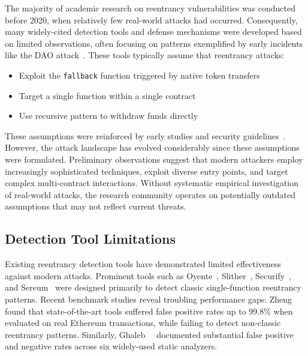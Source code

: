 The majority of academic research on reentrancy vulnerabilities was conducted before 2020, when relatively few real-world attacks had occurred. Consequently, many widely-cited detection tools and defense mechanisms were developed based on limited observations, often focusing on patterns exemplified by early incidents like the DAO attack~\cite{oyente, slither, sereum}. These tools typically assume that reentrancy attacks:
\begin{itemize}
    \item Exploit the \lstinline{fallback} function triggered by native token transfers
    \item Target a single function within a single contract
    \item Use recursive pattern to withdraw funds directly
\end{itemize}
These assumptions were reinforced by early studies and security guidelines~\cite{smart-contract-security-field-guide, rethinking-of-reentrancy}. However, the attack landscape has evolved considerably since these assumptions were formulated. Preliminary observations suggest that modern attackers employ increasingly sophisticated techniques, exploit diverse entry points, and target complex multi-contract interactions. Without systematic empirical investigation of real-world attacks, the research community operates on potentially outdated assumptions that may not reflect current threats.

\subsection{Detection Tool Limitations}

Existing reentrancy detection tools have demonstrated limited effectiveness against modern attacks. Prominent tools such as Oyente~\cite{oyente}, Slither~\cite{slither}, Securify~\cite{securify}, and Sereum~\cite{sereum} were designed primarily to detect classic single-function reentrancy patterns. Recent benchmark studies reveal troubling performance gaps: Zheng~\etal~\cite{turn-the-rudder} found that state-of-the-art tools suffered false positive rates up to 99.8\% when evaluated on real Ethereum transactions, while failing to detect non-classic reentrancy patterns. Similarly, Ghaleb~\etal~\cite{survey:static-analysis} documented substantial false positive and negative rates across six widely-used static analyzers.

